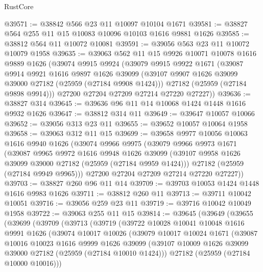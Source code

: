 \begin{lexlean}{RustCore}
\begin{coremodule}
@39571 := @38842 @566 @23 @11 @10097 @10104 @1671
@39581 := @38827 @564 @255 @11 @15 @10083 @10096 @10103 @1616 @9881 @1626
@39585 := @38812 @564 @11 @10072 @10081
@39591 := @39056 @563 @23 @11 @10072 @10079 @1958
@39635 := @39063
    @562
    @11
    @15
    @9926
    @10071
    @10078
    @1616
    @9889
    @1626
    (@39074
      @9915
      @9924
      (@39079
        @9915
        @9922
        @1671
        (@39087
          @9914
          @9921
          @1616
          @9897
          @1626
          @39099
          (@39107 @9907 @1626 @39099 @39000 @27182 (@25959 (@27184 @9908 @1424)))
          @27182
          (@25959 (@27184 @9898 @9914)))
        @27200
        @27204
        @27209
        @27214
        @27220
        @27227))
@39636 := @38827 @314
@39645 := @39636 @96 @11 @14 @10068 @1424 @1448 @1616 @9932 @1626
@39647 := @38812 @314 @11
@39649 := @39647 @10057 @10066
@39652 := @39056 @313 @23 @11
@39655 := @39652 @10057 @10064 @1958
@39658 := @39063 @312 @11 @15
@39699 := @39658
    @9977
    @10056
    @10063
    @1616
    @9940
    @1626
    (@39074
      @9966
      @9975
      (@39079
        @9966
        @9973
        @1671
        (@39087
          @9965
          @9972
          @1616
          @9948
          @1626
          @39099
          (@39107 @9958 @1626 @39099 @39000 @27182 (@25959 (@27184 @9959 @1424)))
          @27182
          (@25959 (@27184 @9949 @9965)))
        @27200
        @27204
        @27209
        @27214
        @27220
        @27227))
@39703 := @38827 @260 @96 @11 @14
@39709 := @39703 @10053 @1424 @1448 @1616 @9983 @1626
@39711 := @38812 @260 @11
@39713 := @39711 @10042 @10051
@39716 := @39056 @259 @23 @11
@39719 := @39716 @10042 @10049 @1958
@39722 := @39063 @255 @11 @15
@39814 := @39645
    (@39649
      (@39655
        (@39699
          (@39709
            (@39713
              (@39719
                (@39722
                  @10028
                  @10041
                  @10048
                  @1616
                  @9991
                  @1626
                  (@39074
                    @10017
                    @10026
                    (@39079
                      @10017
                      @10024
                      @1671
                      (@39087
                        @10016
                        @10023
                        @1616
                        @9999
                        @1626
                        @39099
                        (@39107 @10009 @1626 @39099 @39000 @27182 (@25959 (@27184 @10010 @1424)))
                        @27182
                        (@25959 (@27184 @10000 @10016)))

\end{coremodule}
\end{lexlean}
